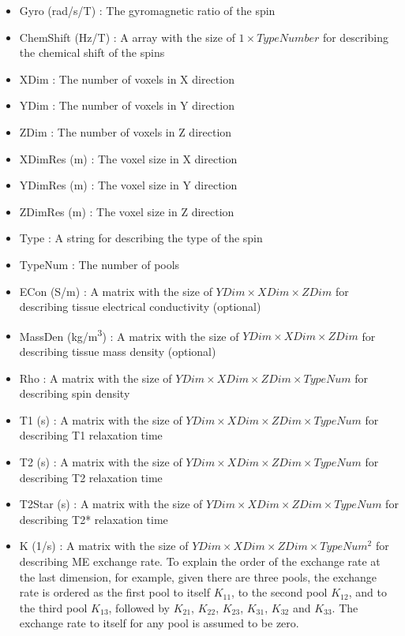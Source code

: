 \documentclass{book}%
\begin{document}
\begin{enumerate}
\begin{itemize}
	\item Gyro (rad/s/T) : The gyromagnetic ratio of the spin
	\item ChemShift (Hz/T) : A array with the size of $1 \times TypeNumber $ for describing the chemical shift of the spins
	\item XDim : The number of voxels in X direction
	\item YDim : The number of voxels in Y direction
	\item ZDim : The number of voxels in Z direction
	\item XDimRes (m) : The voxel size in X direction
	\item YDimRes (m) : The voxel size in Y direction
	\item ZDimRes (m) : The voxel size in Z direction
	\item Type : A string for describing the type of the spin
	\item TypeNum : The number of pools
	\item ECon (S/m) : A matrix with the size of $ YDim \times XDim \times ZDim $ for describing tissue electrical conductivity (optional)
	\item MassDen (kg/m\textsuperscript{3}) : A matrix with the size of $ YDim \times XDim \times ZDim $ for describing tissue mass density (optional)
	\item Rho : A matrix with the size of $ YDim \times XDim \times ZDim \times TypeNum $ for describing spin density
	\item T1 (s) : A matrix with the size of $ YDim \times XDim \times ZDim \times TypeNum $ for describing T1 relaxation time
	\item T2 (s) : A matrix with the size of $ YDim \times XDim \times ZDim \times TypeNum $ for describing T2 relaxation time
	\item T2Star (s) : A matrix with the size of $ YDim \times XDim \times ZDim \times TypeNum $ for describing T2* relaxation time
	\item K (1/s) : A matrix with the size of $ YDim \times XDim \times ZDim \times TypeNum^2 $ for describing ME exchange rate. To explain the order of the exchange rate at the last dimension, for example, given there are three pools, the exchange rate is ordered as the first pool to itself $K_{11}$, to the second pool $K_{12}$, and to the third pool $K_{13}$, followed by $K_{21}$, $K_{22}$, $K_{23}$, $K_{31}$, $K_{32}$ and $K_{33}$. The exchange rate to itself for any pool is assumed to be zero.
\end{itemize}


\end{enumerate}
\end{document}
